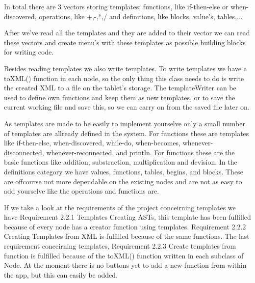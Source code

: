 \documentclass[a4paper,12pt]{report}
\begin{document}
In total there are 3 vectors storing templates; functions, like if-then-else or when-discovered, operations, like +,-,*,/ and definitions, like blocks, value's, tables,...

After we've read all the templates and they are added to their vector we can read these vectors and create menu's with these templates as possible building blocks for writing code.

Besides reading templates we also write templates. To write templates we have a toXML() function in each node, so the only thing this class needs to do is write the created XML to a file on the tablet's storage. The templateWriter
can be used to define own functions and keep them as new templates, or to save the current working file and save this, so we can carry on from the saved file later on.

As templates are made to be easily to implement yourselve only a small number of templates are allready defined in the system. For functions these are templates like if-then-else, when-discovered, while-do, when-becomes,
whenever-disconnected, whenever-reconnected, and println. For functions these are the basic functions like addition, substraction, multiplication and devision. In the definitions category we have values, functions, tables, begins,
and blocks. These are offcourse not more dependable on the existing nodes and are not as easy to add yourselve like the operations and functions are.

If we take a look at the requirements of the project conceirning templates we have Requirement 2.2.1 Templates Creating ASTs, this template has been fulfilled because of every node has a creator function using templates.
Requirement 2.2.2 Creating Templates from XML is fulfilled because of the same functions. The last requirement conceirning templates, Requirement 2.2.3 Create templates from function is fulfilled because of the toXML() function
written in each subclass of Node. At the moment there is no buttons yet to add a new function from within the app, but this can easily be added.
\end{document}
